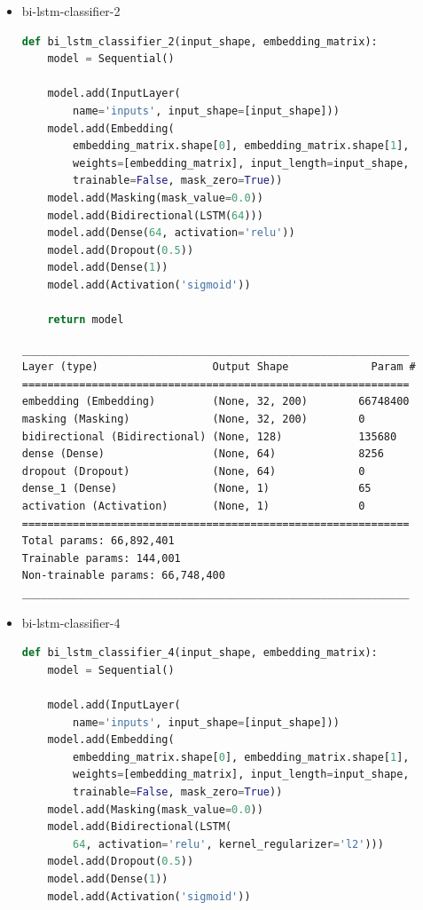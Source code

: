 \documentclass{article}
\begin{document}
\begin{itemize}
  \item bi-lstm-classifier-2

\begin{lstlisting}[language=Python, caption=Дефиниция на bi-lstm-classifier-2.]
def bi_lstm_classifier_2(input_shape, embedding_matrix):
    model = Sequential()

    model.add(InputLayer(
        name='inputs', input_shape=[input_shape]))
    model.add(Embedding(
        embedding_matrix.shape[0], embedding_matrix.shape[1],
        weights=[embedding_matrix], input_length=input_shape,
        trainable=False, mask_zero=True))
    model.add(Masking(mask_value=0.0))
    model.add(Bidirectional(LSTM(64)))
    model.add(Dense(64, activation='relu'))
    model.add(Dropout(0.5))
    model.add(Dense(1))
    model.add(Activation('sigmoid'))

    return model
\end{lstlisting}

\begin{lstlisting}[numbers=none, caption=Обобщение на bi-lstm-classifier-2.]
_____________________________________________________________
Layer (type)                  Output Shape             Param #
=============================================================
embedding (Embedding)         (None, 32, 200)        66748400
masking (Masking)             (None, 32, 200)        0
bidirectional (Bidirectional) (None, 128)            135680
dense (Dense)                 (None, 64)             8256
dropout (Dropout)             (None, 64)             0
dense_1 (Dense)               (None, 1)              65
activation (Activation)       (None, 1)              0
=============================================================
Total params: 66,892,401
Trainable params: 144,001
Non-trainable params: 66,748,400
_____________________________________________________________
\end{lstlisting}

  \item bi-lstm-classifier-4

\begin{lstlisting}[language=Python, caption=Дефиниция на bi-lstm-classifier-4.]
def bi_lstm_classifier_4(input_shape, embedding_matrix):
    model = Sequential()

    model.add(InputLayer(
        name='inputs', input_shape=[input_shape]))
    model.add(Embedding(
        embedding_matrix.shape[0], embedding_matrix.shape[1],
        weights=[embedding_matrix], input_length=input_shape,
        trainable=False, mask_zero=True))
    model.add(Masking(mask_value=0.0))
    model.add(Bidirectional(LSTM(
        64, activation='relu', kernel_regularizer='l2')))
    model.add(Dropout(0.5))
    model.add(Dense(1))
    model.add(Activation('sigmoid'))


\end{lstlisting}
\end{itemize}
\end{document}
